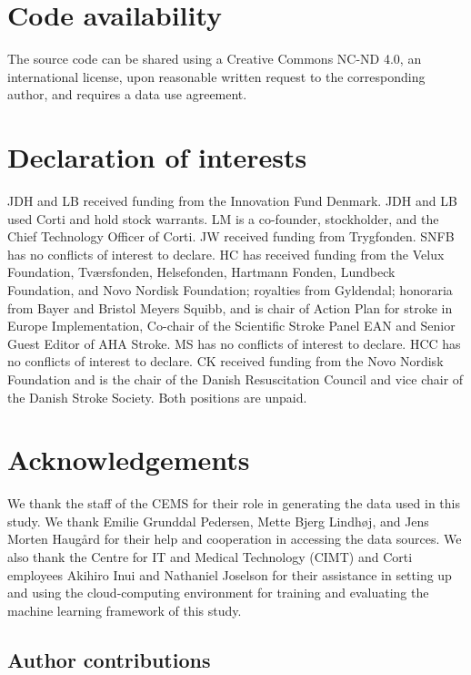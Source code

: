 {\section{Code availability}

The source code can be shared using a Creative Commons NC-ND 4.0, an international license, upon reasonable written request to the corresponding author, and requires a data use agreement.


\section{Declaration of interests}

JDH and LB received funding from the Innovation Fund Denmark. JDH and LB used Corti and hold stock warrants. LM is a co-founder, stockholder, and the Chief Technology Officer of Corti. JW received funding from Trygfonden. SNFB has no conflicts of interest to declare. HC has received funding from the Velux Foundation, Tværsfonden, Helsefonden, Hartmann Fonden, Lundbeck Foundation, and Novo Nordisk Foundation; royalties from Gyldendal; honoraria from Bayer and Bristol Meyers Squibb, and is chair of Action Plan for stroke in Europe Implementation, Co-chair of the Scientific Stroke Panel EAN and Senior Guest Editor of AHA Stroke. MS has no conflicts of interest to declare. HCC has no conflicts of interest to declare. CK received funding from the Novo Nordisk Foundation and is the chair of the Danish Resuscitation Council and vice chair of the Danish Stroke Society. Both positions are unpaid.


\section*{Acknowledgements}

We thank the staff of the CEMS for their role in generating the data used in this study. We thank Emilie Grunddal Pedersen, Mette Bjerg Lindhøj, and Jens Morten Haugård for their help and cooperation in accessing the data sources. We also thank the Centre for IT and Medical Technology (CIMT) and Corti employees Akihiro Inui and Nathaniel Joselson for their assistance in setting up and using the cloud-computing environment for training and evaluating the machine learning framework of this study.


\subsection{Author contributions}

}
